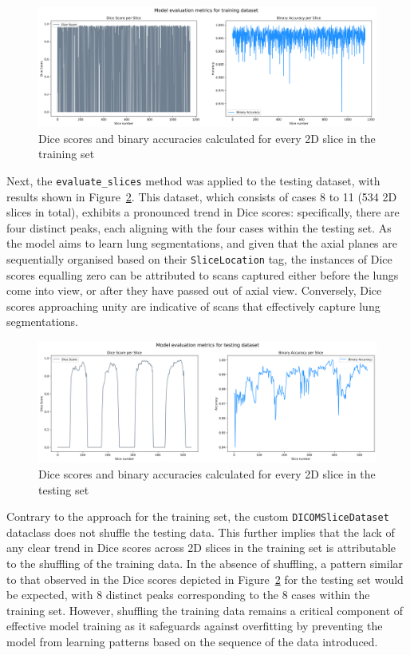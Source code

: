 \documentclass[12pt]{report}
\newcommand{\inlinecode}[1]{\lstinline[style=inline]{#1}}
\begin{document}
\begin{figure}[ht]
    \centering
    \includegraphics[width=\textwidth]{training_scores.png}
    \caption{Dice scores and binary accuracies calculated for every 2D slice in the training set}
    \label{fig:training_scores}
\end{figure}

Next, the \inlinecode{evaluate_slices} method was applied to the testing dataset, with results shown in Figure~\ref{fig:testing_scores}. This dataset, which consists of cases 8 to 11 (534 2D slices in total), exhibits a pronounced trend in Dice scores: specifically, there are four distinct peaks, each aligning with the four cases within the testing set. As the model aims to learn lung segmentations, and given that the axial planes are sequentially organised based on their \texttt{SliceLocation} tag, the instances of Dice scores equalling zero can be attributed to scans captured either before the lungs come into view, or after they have passed out of axial view. Conversely, Dice scores approaching unity are indicative of scans that effectively capture lung segmentations.

\begin{figure}[ht]
    \centering
    \includegraphics[width=\textwidth]{testing_scores.png}
    \caption{Dice scores and binary accuracies calculated for every 2D slice in the testing set}
    \label{fig:testing_scores}
\end{figure}

Contrary to the approach for the training set, the custom \inlinecode{DICOMSliceDataset} dataclass does not shuffle the testing data. This further implies that the lack of any clear trend in Dice scores across 2D slices in the training set is attributable to the shuffling of the training data. In the absence of shuffling, a pattern similar to that observed in the Dice scores depicted in Figure~\ref{fig:testing_scores} for the testing set would be expected, with 8 distinct peaks corresponding to the 8 cases within the training set. However, shuffling the training data remains a critical component of effective model training as it safeguards against overfitting by preventing the model from learning patterns based on the sequence of the data introduced.
\end{document}
